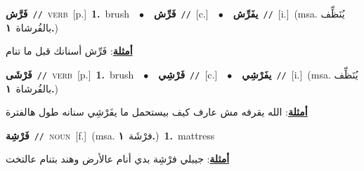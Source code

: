 \documentclass[10pt,a4paper,twoside]{article} %
\begin{document}
\begin{multicols}{2}
{\setlength\topsep{0pt}\textbf{\foreignlanguage{arabic}{فَرَّش}}\ {\color{gray}\texttt{//}\color{black}}\ \textsc{verb}\ [p.]\ \textbf{1.}~brush\ \ $\bullet$\ \ \setlength\topsep{0pt}\textbf{\foreignlanguage{arabic}{فَرِّش}}\ {\color{gray}\texttt{//}\color{black}}\ [c.]\ \ $\bullet$\ \ \setlength\topsep{0pt}\textbf{\foreignlanguage{arabic}{يفَرِّش}}\ {\color{gray}\texttt{//}\color{black}}\ [i.]\ \color{gray}(msa. \foreignlanguage{arabic}{يُنَظِّف بالفُرشاة}~\foreignlanguage{arabic}{\textbf{١.}})\color{black}\  \begin{flushright}\color{gray}\foreignlanguage{arabic}{\textbf{\underline{\foreignlanguage{arabic}{أمثلة}}}: فَرِّش أسنانك قبل ما تنام}\end{flushright}\color{black}} \vspace{2mm}

{\setlength\topsep{0pt}\textbf{\foreignlanguage{arabic}{فَرْشَى}}\ {\color{gray}\texttt{//}\color{black}}\ \textsc{verb}\ [p.]\ \textbf{1.}~brush\ \ $\bullet$\ \ \setlength\topsep{0pt}\textbf{\foreignlanguage{arabic}{فَرْشِي}}\ {\color{gray}\texttt{//}\color{black}}\ [c.]\ \ $\bullet$\ \ \setlength\topsep{0pt}\textbf{\foreignlanguage{arabic}{يفَرْشِي}}\ {\color{gray}\texttt{//}\color{black}}\ [i.]\ \color{gray}(msa. \foreignlanguage{arabic}{يُنَظِّف بالفُرشاة}~\foreignlanguage{arabic}{\textbf{١.}})\color{black}\  \begin{flushright}\color{gray}\foreignlanguage{arabic}{\textbf{\underline{\foreignlanguage{arabic}{أمثلة}}}: الله يقرفه مش عارف كيف بيستحمل ما يفَرْشِي سنانه طول هالفترة}\end{flushright}\color{black}} \vspace{2mm}

{\setlength\topsep{0pt}\textbf{\foreignlanguage{arabic}{فَرْشِة}}\ {\color{gray}\texttt{//}\color{black}}\ \textsc{noun}\ [f.]\ \color{gray}(msa. \foreignlanguage{arabic}{فرْشَة}~\foreignlanguage{arabic}{\textbf{١.}})\color{black}\ \textbf{1.}~mattress\  \begin{flushright}\color{gray}\foreignlanguage{arabic}{\textbf{\underline{\foreignlanguage{arabic}{أمثلة}}}: جيبلي فرْشِة بدي أنام عالأرض وهند بتنام عالتخت}\end{flushright}\color{black}} \vspace{2mm}


\end{multicols}
\end{document}
